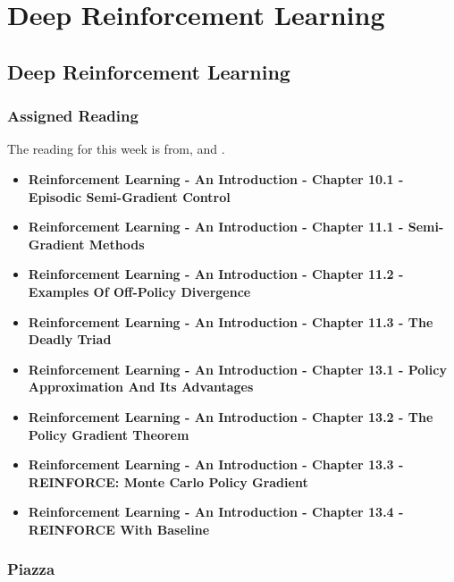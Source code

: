 \clearpage

\renewcommand{\ChapTitle}{Deep Reinforcement Learning}
\renewcommand{\SectionTitle}{Deep Reinforcement Learning}

\chapter{\ChapTitle}

\section{\SectionTitle}

\subsection{Assigned Reading}

The reading for this week is from, \AITextbook \hspace*{1pt} and \RLTextbook.

\begin{itemize}
    \item \textbf{Reinforcement Learning - An Introduction - Chapter 10.1 - Episodic Semi-Gradient Control}
    \item \textbf{Reinforcement Learning - An Introduction - Chapter 11.1 - Semi-Gradient Methods}
    \item \textbf{Reinforcement Learning - An Introduction - Chapter 11.2 - Examples Of Off-Policy Divergence}
    \item \textbf{Reinforcement Learning - An Introduction - Chapter 11.3 - The Deadly Triad}
    \item \textbf{Reinforcement Learning - An Introduction - Chapter 13.1 - Policy Approximation And Its Advantages}
    \item \textbf{Reinforcement Learning - An Introduction - Chapter 13.2 - The Policy Gradient Theorem}
    \item \textbf{Reinforcement Learning - An Introduction - Chapter 13.3 - REINFORCE: Monte Carlo Policy Gradient}
    \item \textbf{Reinforcement Learning - An Introduction - Chapter 13.4 - REINFORCE With Baseline}
\end{itemize}

\subsection{Piazza}

